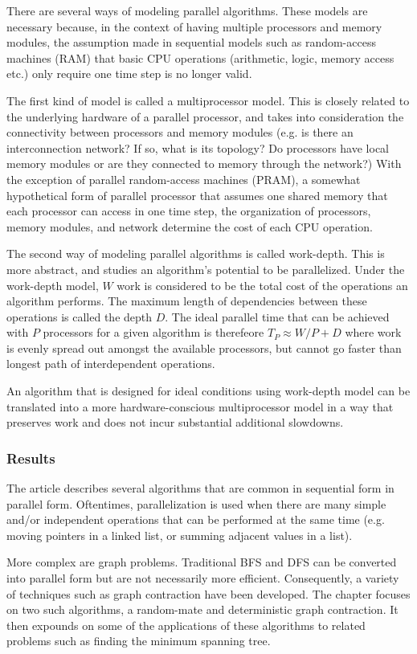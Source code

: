 There are several ways of modeling parallel algorithms. These models are necessary because, in the context of having multiple processors and memory modules, the assumption made in sequential models such as random-access machines (RAM) that basic CPU operations (arithmetic, logic, memory access etc.) only require one time step is no longer valid. 

The first kind of model is called a multiprocessor model. This is closely related to the underlying hardware of a parallel processor, and takes into consideration the connectivity between processors and memory modules (e.g. is there an interconnection network? If so, what is its topology? Do processors have local memory modules or are they connected to memory through the network?) With the exception of parallel random-access machines (PRAM), a somewhat hypothetical form of parallel processor that assumes one shared memory that each processor can access in one time step, the organization of processors, memory modules, and network determine the cost of each CPU operation.

The second way of modeling parallel algorithms is called work-depth. This is more abstract, and studies an algorithm's potential to be parallelized. Under the work-depth model, $W$ work is considered to be the total cost of the operations an algorithm performs. The maximum length of dependencies between these operations is called the depth $D$. The ideal parallel time that can be achieved with $P$ processors for a given algorithm is therefeore $T_P \approx W/P + D$ where work is evenly spread out amongst the available processors, but cannot go faster than longest path of interdependent operations.

An algorithm that is designed for ideal conditions using work-depth model can be translated into a more hardware-conscious multiprocessor model in a way that preserves work and does not incur substantial additional slowdowns. 

\subsubsection{Results}

The article describes several algorithms that are common in sequential form in parallel form. Oftentimes, parallelization is used when there are many simple and/or independent operations that can be performed at the same time (e.g. moving pointers in a linked list, or summing adjacent values in a list). 

More complex are graph problems. Traditional BFS and DFS can be converted into parallel form but are not necessarily more efficient. Consequently, a variety of techniques such as graph contraction have been developed. The chapter focuses on two such algorithms, a random-mate and deterministic graph contraction. It then expounds on some of the applications of these algorithms to related problems such as finding the minimum spanning tree. 

